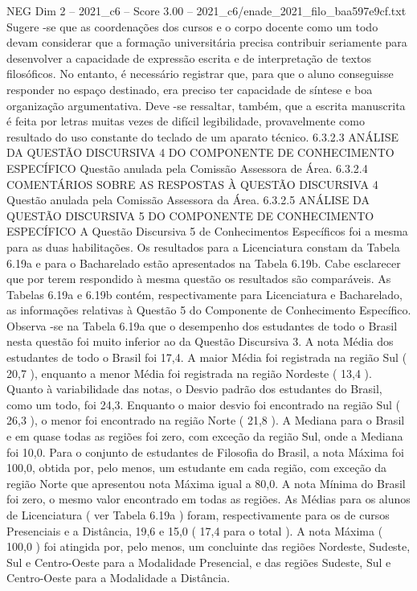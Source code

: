 \begin{textsample}{NEG Dim 2 – 2021\_c6 – Score 3.00 – 2021\_c6/enade\_2021\_filo\_baa597e9cf.txt}
Sugere -se que as coordenações dos cursos e o corpo docente como um todo devam considerar que a formação universitária precisa contribuir seriamente para desenvolver a capacidade de expressão escrita e de interpretação de textos filosóficos.
No entanto, é necessário registrar que, para que o aluno conseguisse responder no espaço destinado, era preciso ter capacidade de síntese e boa organização argumentativa.
Deve -se ressaltar, também, que a escrita manuscrita é feita por letras muitas vezes de difícil legibilidade, provavelmente como resultado do uso constante do teclado de um aparato técnico. 6.3.2.3 ANÁLISE DA QUESTÃO DISCURSIVA 4 DO COMPONENTE DE CONHECIMENTO ESPECÍFICO Questão anulada pela Comissão Assessora de Área. 6.3.2.4 COMENTÁRIOS SOBRE AS RESPOSTAS À QUESTÃO DISCURSIVA 4 Questão anulada pela Comissão Assessora da Área. 6.3.2.5 ANÁLISE DA QUESTÃO DISCURSIVA 5 DO COMPONENTE DE CONHECIMENTO ESPECÍFICO A Questão Discursiva 5 de Conhecimentos Específicos foi a mesma para as duas habilitações.
Os resultados para a Licenciatura constam da Tabela 6.19a e para o Bacharelado estão apresentados na Tabela 6.19b.
Cabe esclarecer que por terem respondido à mesma questão os resultados são comparáveis.
As Tabelas 6.19a e 6.19b contém, respectivamente para Licenciatura e Bacharelado, as informações relativas à Questão 5 do Componente de Conhecimento Específico.
Observa -se na Tabela 6.19a que o desempenho dos estudantes de todo o Brasil nesta questão foi muito inferior ao da Questão Discursiva 3.
A nota Média dos estudantes de todo o Brasil foi 17,4.
A maior Média foi registrada na região Sul ( 20,7 ), enquanto a menor Média foi registrada na região Nordeste ( 13,4 ).
Quanto à variabilidade das notas, o Desvio padrão dos estudantes do Brasil, como um todo, foi 24,3.
Enquanto o maior desvio foi encontrado na região Sul ( 26,3 ), o menor foi encontrado na região Norte ( 21,8 ).
A Mediana para o Brasil e em quase todas as regiões foi zero, com exceção da região Sul, onde a Mediana foi 10,0.
Para o conjunto de estudantes de Filosofia do Brasil, a nota Máxima foi 100,0, obtida por, pelo menos, um estudante em cada região, com exceção da região Norte que apresentou nota Máxima igual a 80,0.
A nota Mínima do Brasil foi zero, o mesmo valor encontrado em todas as regiões.
As Médias para os alunos de Licenciatura ( ver Tabela 6.19a ) foram, respectivamente para os de cursos Presenciais e a Distância, 19,6 e 15,0 ( 17,4 para o total ).
A nota Máxima ( 100,0 ) foi atingida por, pelo menos, um concluinte das regiões Nordeste, Sudeste, Sul e Centro-Oeste para a Modalidade Presencial, e das regiões Sudeste, Sul e Centro-Oeste para a Modalidade a Distância.

\end{textsample}
